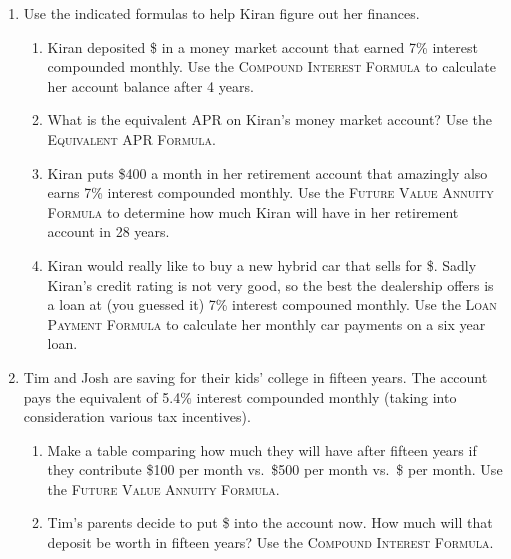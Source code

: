 \begin{enumerate}
\item Use the indicated formulas to help Kiran figure out her finances.
\begin{enumerate}
\item Kiran deposited \$ in a money market account that earned 7\% interest compounded monthly.  Use the \textsc{Compound Interest Formula} to calculate her account balance after 4 years. \vfill
\item What is the equivalent APR on Kiran's money market account?  Use the \textsc{Equivalent APR Formula.} \vfill
\item Kiran puts \$400 a month in her retirement account that amazingly also earns 7\% interest compounded monthly.  Use the \textsc{Future Value Annuity Formula} to determine how much Kiran will have in her retirement account in 28 years. \vfill
\item Kiran would really like to buy a new hybrid car that sells for \$.  Sadly Kiran's credit rating is not very good, so the best the dealership offers is a loan at (you guessed it) 7\% interest compouned monthly.  Use the \textsc{Loan Payment Formula} to calculate her monthly car payments on a six year loan. \vfill
\end{enumerate}

\newpage %

\item Tim and Josh are saving for their kids' college in fifteen years. The account pays the equivalent of 5.4\% interest compounded monthly (taking into consideration various tax incentives). 
 \begin{enumerate}
\item Make a table comparing how much they will have after fifteen years if  they contribute  \$100 per month vs.\ \$500 per month vs.\ \$ per month. Use the \textsc{Future Value Annuity Formula}. \vfill  \vfill \vfill
\item Tim's parents decide to put \$ into the account now.  How much will that deposit be worth in fifteen years?  Use the \textsc{Compound Interest Formula}.  \vfill  \vfill
\end{enumerate}


\end{enumerate}
